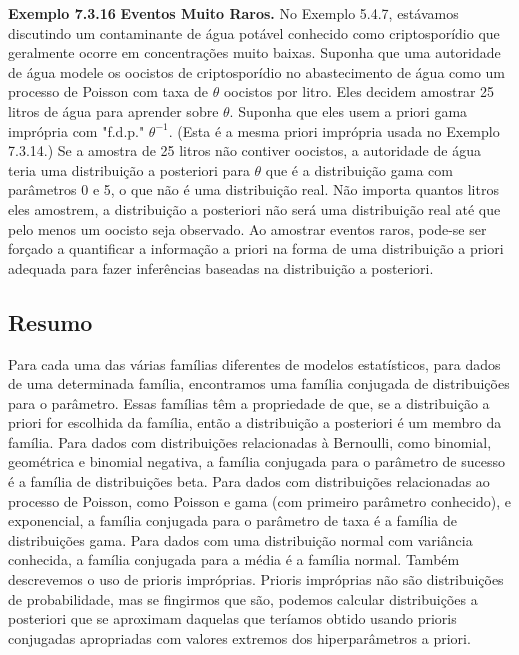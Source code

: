 \vspace{1cm}
\noindent\textbf{Exemplo 7.3.16} \quad \textbf{Eventos Muito Raros.} No Exemplo 5.4.7, estávamos discutindo um contaminante de água potável conhecido como criptosporídio que geralmente ocorre em concentrações muito baixas. Suponha que uma autoridade de água modele os oocistos de criptosporídio no abastecimento de água como um processo de Poisson com taxa de $\theta$ oocistos por litro. Eles decidem amostrar 25 litros de água para aprender sobre $\theta$. Suponha que eles usem a priori gama imprópria com "f.d.p." $\theta^{-1}$. (Esta é a mesma priori imprópria usada no Exemplo 7.3.14.) Se a amostra de 25 litros não contiver oocistos, a autoridade de água teria uma distribuição a posteriori para $\theta$ que é a distribuição gama com parâmetros 0 e 5, o que não é uma distribuição real. Não importa quantos litros eles amostrem, a distribuição a posteriori não será uma distribuição real até que pelo menos um oocisto seja observado. Ao amostrar eventos raros, pode-se ser forçado a quantificar a informação a priori na forma de uma distribuição a priori adequada para fazer inferências baseadas na distribuição a posteriori.

\subsection*{Resumo}
Para cada uma das várias famílias diferentes de modelos estatísticos, para dados de uma determinada família, encontramos uma família conjugada de distribuições para o parâmetro. Essas famílias têm a propriedade de que, se a distribuição a priori for escolhida da família, então a distribuição a posteriori é um membro da família. Para dados com distribuições relacionadas à Bernoulli, como binomial, geométrica e binomial negativa, a família conjugada para o parâmetro de sucesso é a família de distribuições beta. Para dados com distribuições relacionadas ao processo de Poisson, como Poisson e gama (com primeiro parâmetro conhecido), e exponencial, a família conjugada para o parâmetro de taxa é a família de distribuições gama. Para dados com uma distribuição normal com variância conhecida, a família conjugada para a média é a família normal. Também descrevemos o uso de prioris impróprias. Prioris impróprias não são distribuições de probabilidade, mas se fingirmos que são, podemos calcular distribuições a posteriori que se aproximam daquelas que teríamos obtido usando prioris conjugadas apropriadas com valores extremos dos hiperparâmetros a priori.

